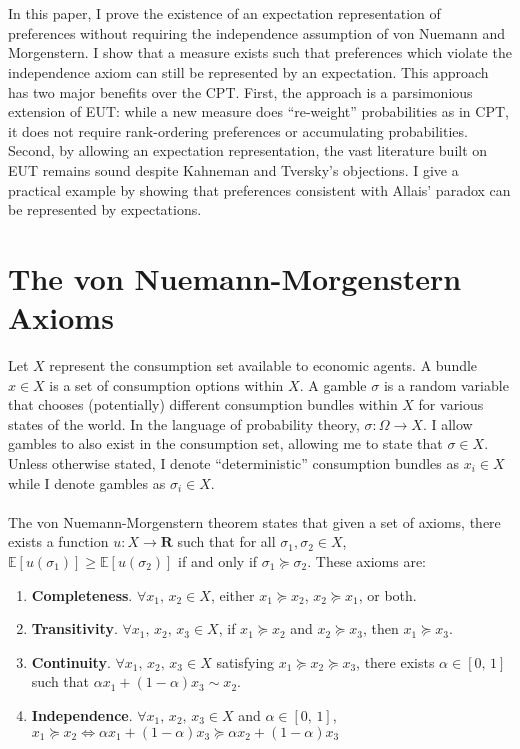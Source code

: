 \documentclass{article}
\begin{document}
\\
\\
In this paper, I prove the existence of an expectation representation of preferences without requiring the independence assumption of von Nuemann and Morgenstern.  I show that a measure exists such that preferences which violate the independence axiom can still be represented by an expectation.  This approach has two major benefits over the CPT.  First, the approach is a parsimonious extension of EUT: while a new measure does ``re-weight'' probabilities as in CPT, it does not require rank-ordering preferences or accumulating probabilities.  Second, by allowing an expectation representation, the vast literature built on EUT remains sound despite Kahneman and Tversky's objections. I give a practical example by showing that preferences consistent with Allais' paradox can be represented by expectations.  

\section{The von Nuemann-Morgenstern Axioms}

Let \(X\) represent the consumption set available to economic agents.  A bundle \(x \in X\) is a set of consumption options within \(X\).  A gamble \(\sigma\) is a random variable that chooses (potentially) different consumption bundles within \(X\) for various states of the world.  In the language of probability theory, \(\sigma: \Omega \to X\).  I allow gambles to also exist in the consumption set, allowing me to state that \(\sigma \in X\).  Unless otherwise stated, I denote ``deterministic'' consumption bundles as \(x_i \in X\) while I denote gambles as \(\sigma_i \in X\).     
\\
\\
The von Nuemann-Morgenstern theorem states that given a set of axioms, there exists a function \(u: X \to \mathbf{R}\) such that for all \(\sigma_1, \sigma_2 \in X\), \(\mathbb{E}\left[u(\sigma_1)\right] \geq \mathbb{E}\left[u(\sigma_2)\right]\) if and only if \(\sigma_1 \succeq  \sigma_2\).  These axioms are:

\begin{enumerate}
	\item \textbf{Completeness}.  \(\forall x_1, \, x_2 \in X\), either \(x_1 \succeq  x_2\), \(x_2 \succeq  x_1\), or both.
	\item \textbf{Transitivity}.  \(\forall x_1, \, x_2,\, x_3 \in X\), if \(x_1 \succeq  x_2\) and \(x_2 \succeq  x_3\), then \(x_1 \succeq  x_3\).
	\item \textbf{Continuity}.  \(\forall x_1, \, x_2,\,x_3 \in X\) satisfying \(x_1 \succeq  x_2 \succeq  x_3\), there exists \(\alpha \in [0,\,1]\) such that \(\alpha x_1+(1-\alpha) x_3 \sim x_2\).
	\item \textbf{Independence}.  \(\forall x_1, \, x_2,\,x_3 \in X\) and \(\alpha \in [0,\,1]\), \(x_1 \succeq  x_2 \Leftrightarrow \alpha x_1+(1-\alpha)x_3 \succeq  \alpha x_2 +(1-\alpha)x_3\)
\end{enumerate}
\end{document}
